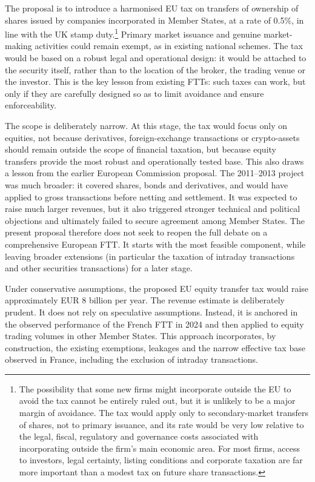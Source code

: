 \documentclass[../../main]{subfiles}
\begin{document}
The proposal is to introduce a harmonised EU tax on transfers of ownership of shares issued by companies incorporated in Member States, at a rate of 0.5\%, in line with the UK stamp duty.\footnote{The possibility that some new firms might incorporate outside the EU to avoid the tax cannot be entirely ruled out, but it is unlikely to be a major margin of avoidance. The tax would apply only to secondary-market transfers of shares, not to primary issuance, and its rate would be very low relative to the legal, fiscal, regulatory and governance costs associated with incorporating outside the firm's main economic area. For most firms, access to investors, legal certainty, listing conditions and corporate taxation are far more important than a modest tax on future share transactions.} Primary market issuance and genuine market-making activities could remain exempt, as in existing national schemes. The tax would be based on a robust legal and operational design: it would be attached to the security itself, rather than to the location of the broker, the trading venue or the investor. This is the key lesson from existing FTTs: such taxes can work, but only if they are carefully designed so as to limit avoidance and ensure enforceability.

The scope is deliberately narrow. At this stage, the tax would focus only on equities, not because derivatives, foreign-exchange transactions or crypto-assets should remain outside the scope of financial taxation, but because equity transfers provide the most robust and operationally tested base. This also draws a lesson from the earlier European Commission proposal. The 2011--2013 project was much broader: it covered shares, bonds and derivatives, and would have applied to gross transactions before netting and settlement. It was expected to raise much larger revenues, but it also triggered stronger technical and political objections and ultimately failed to secure agreement among Member States. The present proposal therefore does not seek to reopen the full debate on a comprehensive European FTT. It starts with the most feasible component, while leaving broader extensions (in particular the taxation of intraday transactions and other securities transactions) for a later stage.

Under conservative assumptions, the proposed EU equity transfer tax would raise approximately EUR 8 billion per year. The revenue estimate is deliberately prudent. It does not rely on speculative assumptions. Instead, it is anchored in the observed performance of the French FTT in 2024 and then applied to equity trading volumes in other Member States. This approach incorporates, by construction, the existing exemptions, leakages and the narrow effective tax base observed in France, including the exclusion of intraday transactions. 
\end{document}
